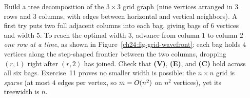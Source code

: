 \begin{labbox}
Build a tree decomposition of the $3\times 3$ grid graph (nine vertices arranged in
$3$ rows and $3$ columns, with edges between horizontal and vertical neighbors). A
first try puts two full adjacent columns into each bag, giving bags of $6$ vertices
and width $5$. To reach the optimal width $3$, advance from column $1$ to column
$2$ \emph{one row at a time}, as shown in Figure~\ref{ch24:fig-grid-wavefront}:
each bag holds $4$ vertices along the step-shaped frontier between the two columns,
dropping $(r,1)$ right after $(r,2)$ has joined. Check that \textbf{(V)},
\textbf{(E)}, and \textbf{(C)} hold across all six bags. Exercise~11 proves no
smaller width is possible: the $n\times n$ grid is \emph{sparse} (at most $4$ edges
per vertex, so $m=O(n^2)$ on $n^2$ vertices), yet its treewidth is $n$.
\end{labbox}

